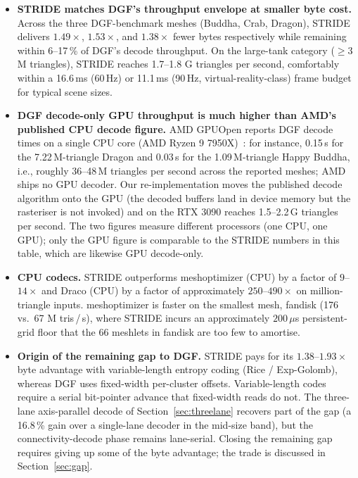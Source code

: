 \documentclass[pdflatex,sn-vancouver-num]{sn-jnl}%
\theoremstyle{thmstyleone}%
\theoremstyle{thmstyletwo}%
\theoremstyle{thmstylethree}%
\begin{document}
\begin{itemize}
\item \textbf{STRIDE matches DGF's throughput envelope at smaller byte cost.} Across the three DGF-benchmark meshes (Buddha, Crab, Dragon), STRIDE delivers $1.49\times$, $1.53\times$, and $1.38\times$ fewer bytes respectively while remaining within 6--17\,\% of DGF's decode throughput. On the large-tank category ($\ge 3$\,M triangles), STRIDE reaches 1.7--1.8 G triangles per second, comfortably within a 16.6\,ms (60\,Hz) or 11.1\,ms (90\,Hz, virtual-reality-class) frame budget for typical scene sizes.
\item \textbf{DGF decode-only GPU throughput is much higher than AMD's published CPU decode figure.} AMD GPUOpen reports DGF decode times on a single CPU core (AMD Ryzen 9 7950X)~\cite{ref09_amd_dgf_blog}: for instance, 0.15\,s for the 7.22\,M-triangle Dragon and 0.03\,s for the 1.09\,M-triangle Happy Buddha, i.e., roughly 36--48\,M triangles per second across the reported meshes; AMD ships no GPU decoder. Our re-implementation moves the published decode algorithm onto the GPU (the decoded buffers land in device memory but the rasteriser is not invoked) and on the RTX 3090 reaches 1.5--2.2\,G triangles per second. The two figures measure different processors (one CPU, one GPU); only the GPU figure is comparable to the STRIDE numbers in this table, which are likewise GPU decode-only.
\item \textbf{CPU codecs.} STRIDE outperforms meshoptimizer (CPU) by a factor of $9$--$14\times$ and Draco (CPU) by a factor of approximately $250$--$490\times$ on million-triangle inputs. meshoptimizer is faster on the smallest mesh, fandisk (176 vs.\ 67 M tris\,/\,s), where STRIDE incurs an approximately $200\,\mu$s persistent-grid floor that the 66 meshlets in fandisk are too few to amortise.
\item \textbf{Origin of the remaining gap to DGF.} STRIDE pays for its $1.38$--$1.93\times$ byte advantage with variable-length entropy coding (Rice / Exp-Golomb), whereas DGF uses fixed-width per-cluster offsets. Variable-length codes require a serial bit-pointer advance that fixed-width reads do not. The three-lane axis-parallel decode of Section~\ref{sec:threelane} recovers part of the gap (a 16.8\,\% gain over a single-lane decoder in the mid-size band), but the connectivity-decode phase remains lane-serial. Closing the remaining gap requires giving up some of the byte advantage; the trade is discussed in Section~\ref{sec:gap}.
\end{itemize}
\end{document}
